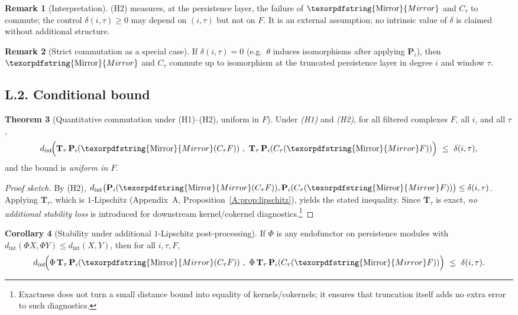 \documentclass[11pt]{article}
\numberwithin{equation}{section}
\theoremstyle{plain}
\theoremstyle{definition}
\theoremstyle{remark}
\theoremstyle{plain}
\theoremstyle{definition}
\numberwithin{equation}{section}
\newtheorem{theorem}{Theorem}[section]
\newtheorem{corollary}[theorem]{Corollary}
\theoremstyle{definition}
\newtheorem{remark}[theorem]{Remark}
\DeclareRobustCommand{\Mirror}{\texorpdfstring{\ensuremath{\operatorname{Mirror}}}{Mirror}}
\numberwithin{equation}{section}
\theoremstyle{plain}
\theoremstyle{definition}
\theoremstyle{remark}
\providecommand{\n}{\unskip\space}
\begin{document}
\begin{remark}[Interpretation]
(H2) measures, at the persistence layer, the failure of \(\Mirror\) and \(C_\tau\) to commute; the control \(\delta(i,\tau)\ge 0\) may depend on \((i,\tau)\) but not on \(F\). It is an external assumption; no intrinsic value of \(\delta\) is claimed without additional structure.
\end{remark}

\begin{remark}[Strict commutation as a special case]
If \(\delta(i,\tau)=0\) (e.g.\ \(\theta\) induces isomorphisms after applying \(\mathbf{P}_i\)), then \(\Mirror\) and \(C_\tau\) commute up to isomorphism at the truncated persistence layer in degree \(i\) and window \(\tau\).
\end{remark}

\subsection*{L.2. Conditional bound}
\begin{theorem}[Quantitative commutation under (H1)–(H2), uniform in \(F\)]\label{L:thm:cond}
Under \emph{(H1)} and \emph{(H2)}, for all filtered complexes \(F\), all \(i\), and all \(\tau\),
\[
  d_{\mathrm{int}}\!\Big(
       \mathbf{T}_\tau\,\mathbf{P}_i(\Mirror(C_\tau F))\ ,\ 
       \mathbf{T}_\tau\,\mathbf{P}_i(C_\tau(\Mirror F))\n  \Big)\ \le\ \delta(i,\tau),
\]
and the bound is \emph{uniform in \(F\)}.
\end{theorem}

\begin{proof}[Proof sketch]
By (H2),
\(d_{\mathrm{int}}\big(\mathbf{P}_i(\Mirror(C_\tau F)),\mathbf{P}_i(C_\tau(\Mirror F))\big)\le\delta(i,\tau)\).
Applying \(\mathbf{T}_\tau\), which is \(1\)-Lipschitz (Appendix~A, Proposition~\ref{A:prop:lipschitz}), yields the stated inequality.
Since \(\mathbf{T}_\tau\) is exact, \emph{no additional stability loss} is introduced for downstream kernel/cokernel diagnostics.\footnote{Exactness does not turn a small distance bound into equality of kernels/cokernels; it ensures that truncation itself adds no extra error to such diagnostics.}
\end{proof}

\begin{corollary}[Stability under additional \(1\)-Lipschitz post-processing]
If \(\Phi\) is any endofunctor on persistence modules with \(d_{\mathrm{int}}(\Phi X,\Phi Y)\le d_{\mathrm{int}}(X,Y)\), then for all \(i,\tau,F\),
\[
  d_{\mathrm{int}}\!\Big(
       \Phi\,\mathbf{T}_\tau\,\mathbf{P}_i(\Mirror(C_\tau F))\ ,\ 
       \Phi\,\mathbf{T}_\tau\,\mathbf{P}_i(C_\tau(\Mirror F))\n  \Big)\ \le\ \delta(i,\tau).
\]
\end{corollary}
\end{document}
